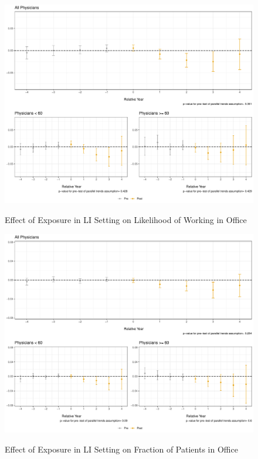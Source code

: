 \documentclass[11pt]{article}
\begin{document}
\begin{figure}[p]
    \centering
    \caption{Effect of Exposure in LI Setting on Likelihood of Working in Office}
    \includegraphics[scale=.4]{Objects/officeind_plot_LI.pdf}
    \label{fig:officeind_LI}
\end{figure}

\begin{figure}[p]
    \centering
    \caption{Effect of Exposure in LI Setting on Fraction of Patients in Office}
    \includegraphics[scale=.4]{Objects/officefrac_plot_LI.pdf}
    \label{fig:officefrac_LI}
\end{figure}
\end{document}
